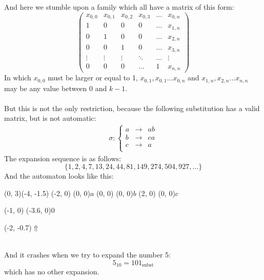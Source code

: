 \documentclass{article}
\begin{document}
And here we stumble upon a family which all have a matrix of this form:
\begin{displaymath}
\left( \begin{array}{cccccc}
x_{0, 0} & x_{0, 1} & x_{0, 2} & x_{0, 3} & \ldots & x_{0, n}\\
1 & 0 & 0 & 0 & \ldots & x_{1, n}\\
0 & 1 & 0 & 0 & \ldots & x_{2, n}\\
0 & 0 & 1 & 0 & \ldots & x_{3, n}\\
\vdots & \vdots & \vdots & \ddots & \ldots & \vdots\\
0 & 0 & 0 & \ldots & 1 & x_{n, n}
\end{array} \right)
\end{displaymath}
In which $x_{0, 0}$ must be larger or equal to 1, 
$x_{0, 1}, x_{0, 1}... x_{0, n}$ and $x_{1, n}, x_{2, n}... x_{n, n}$ may 
be any value between 0 and $k - 1$.\\
\\
But this is not the only restriction, because the following substitution has
a valid matrix, but is not automatic:
\begin{eqnarray*}
\sigma: \left\{ \begin{array}{lll}
a &\rightarrow& ab\\
b &\rightarrow& ca\\
c &\rightarrow& a\\
\end{array} \right.
\end{eqnarray*}
The expansion sequence is as follows:
\begin{displaymath}
\{1, 2, 4, 7, 13, 24, 44, 81, 149, 274, 504, 927, ... \}
\end{displaymath}
And the automaton looks like this:\\
\begin{graph}(0, 3)(-4, -1.5)
  (-2, 0) (0, 0){$a$}
  (0, 0)  (0, 0){$b$}
  (2, 0)  (0, 0){$c$}

  (-1, 0) \freetext(-3.6, 0){0}
   
   
   
   

  \freetext(-2, -0.7){$\Uparrow$}
\end{graph}\\
And it crashes when we try to expand the number 5:
\begin{displaymath}
5_{10} = 101_{\mathrm{subst}}
\end{displaymath}
which has no other expansion.
\end{document}
